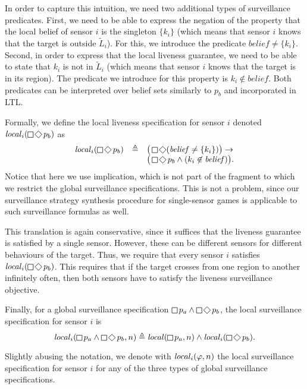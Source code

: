 In order to capture this intuition, we need two additional types of surveillance predicates. First, we need to be able to express the negation of the property that the local belief of sensor $i$ is the singleton $\{k_i\}$ (which means that sensor $i$ knows that the target is outside $\widetilde L_i$). For this, we introduce the predicate $\mathit{belief} \neq \{k_i\}$. Second, in order to express that the local liveness guarantee, we need to be able to state that $k_i$ is not in $\widetilde L_i$ (which means that sensor $i$ knows that the target is in its region). The predicate we introduce for this property is $k_i \not\in\mathit{belief}$. Both predicates can be interpreted over belief sets similarly to $p_b$ and incorporated in LTL.
 
Formally, we define the local liveness specification for sensor $i$ denoted $\locspec_i(\LTLglobally\LTLfinally p_b)$ as
\[
\begin{array}{lll}
\locspec_i(\LTLglobally\LTLfinally p_b) & \triangleq &
\big(\LTLglobally\LTLfinally (\mathit{belief} \neq \{k_i\} )\big)\rightarrow\\&& \big(\LTLglobally\LTLfinally p_b \wedge (k_i \not\in\mathit{belief})\big).
\end{array}
\]
Notice that here we use implication, which is not part of the fragment to which we restrict the global surveillance specifications. This is not a problem, since our surveillance strategy synthesis procedure for single-sensor games is applicable to such surveillance formulas as well.

This translation is again conservative, since it suffices that the liveness guarantee is satisfied by a single sensor. However, these can be different sensors for different behaviours of the target. Thus, we require that every sensor $i$ satisfies $\locspec_i(\LTLglobally\LTLfinally p_b)$. This requires that if the target crosses from one region to another infinitely often, then both sensors have to satisfy the liveness surveillance objective.

Finally, for a global surveillance specification $\LTLglobally p_a \wedge \LTLglobally\LTLfinally p_b$, the local surveillance specification for sensor $i$ is
\[\locspec_i(\LTLglobally p_a\wedge  \LTLglobally\LTLfinally p_b,n)\triangleq
\locspec(\LTLglobally p_a,n) \wedge\locspec_i(\LTLglobally\LTLfinally p_b) .
\]

Slightly abusing the notation, we denote with $\mathit{local}_i(\varphi,n)$ the local surveillance specification for sensor $i$ for any of the three types of global surveillance specifications.

